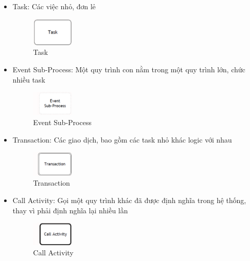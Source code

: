 \begin{itemize}
    \item Task: Các việc nhỏ, đơn lẻ
          \begin{figure}[!htp]
              \begin{center}
                  \includegraphics[width=2cm]{img/theory/BPMN/Task.png}
              \end{center}
              \caption{Task \cite{theoryBPMN0}}
          \end{figure}
    \item Event Sub-Process: Một quy trình con nằm trong một quy trình lớn, chức nhiều task
          \begin{figure}[!htp]
              \begin{center}
                  \includegraphics[width=2cm]{img/theory/BPMN/Event Sub-process.png}
              \end{center}
              \caption{Event Sub-Process \cite{theoryBPMN0}}
          \end{figure}
    \item Transaction: Các giao dịch, bao gồm các task nhỏ khác logic với nhau
          \begin{figure}[!htp]
              \begin{center}
                  \includegraphics[width=2cm]{img/theory/BPMN/Transaction.png}
              \end{center}
              \caption{Transaction \cite{theoryBPMN0}}
          \end{figure}
    \item Call Activity: Gọi một quy trình khác đã được định nghĩa trong hệ thống, thay vì phải định nghĩa lại nhiều lần
          \begin{figure}[!htp]

              \begin{center}
                  \includegraphics[width=2cm]{img/theory/BPMN/Call Activity.png}
              \end{center}
              \caption{Call Activity \cite{theoryBPMN0}}
          \end{figure}
\end{itemize}



